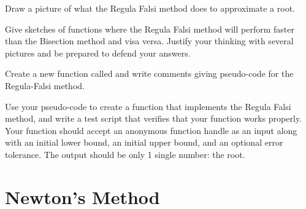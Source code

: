 \begin{problem}
    Draw a picture of what the Regula Falsi method does to approximate a root.
\end{problem}


\begin{problem}
    Give sketches of functions where the Regula Falsi method will perform faster than the
    Bisection method and visa versa.  Justify your thinking with several pictures and be
    prepared to defend your answers.
\end{problem}

\begin{problem}
    Create a new \ProgLang function called  and write comments giving
    pseudo-code for the Regula-Falsi method.
\end{problem}

\begin{problem}
   Use your pseudo-code to create a \ProgLang function that implements the Regula Falsi method, and write a test script
   that verifies that your function works properly. Your function should accept an
    anonymous function handle as an input along with an initial lower bound, an initial
    upper bound, and an optional error tolerance. The output should be only 1 single number: the
    root.\\
    \ifnum{} 
    \else
    \fi
\end{problem}



\newpage\section{Newton's Method}

